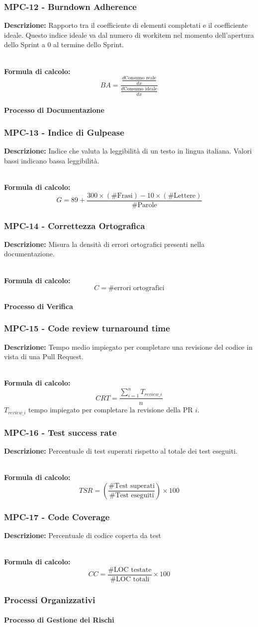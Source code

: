 \documentclass[a4paper,12pt]{article}
\newcommand{\metricdef}[3]{
    \subsubsection*{#1 - #2}
    \textbf{Descrizione:} #3
}
\newcommand{\metricformula}[1]{
    \\[0.5em]
    \textbf{Formula di calcolo:}
    \begin{equation*}
        #1
    \end{equation*}
}
\begin{document}
\metricdef{MPC-12}{Burndown Adherence}
{Rapporto tra il coefficiente di elementi completati e il coefficiente ideale. Questo indice ideale va dal numero di workitem nel momento dell'apertura dello Sprint a 0 al termine dello Sprint.}
\metricformula{BA = \frac{\frac{d \text{Consumo reale}}{dx}}{\frac{d \text{Consumo ideale}}{dx}}}

\paragraph{Processo di Documentazione}

\metricdef{MPC-13}{Indice di Gulpease}
{Indice che valuta la leggibilità di un testo in lingua italiana. Valori bassi indicano bassa leggibilità.}
\metricformula{G = 89 + \frac{300 \times (\#\text{Frasi}) - 10 \times (\#\text{Lettere})}{\#\text{Parole}}}

\metricdef{MPC-14}{Correttezza Ortografica}
{Misura la densità di errori ortografici presenti nella documentazione.}
\metricformula{C = \#\text{errori ortografici}}

\paragraph{Processo di Verifica}

\metricdef{MPC-15}{Code review turnaround time}
{Tempo medio impiegato per completare una revisione del codice in vista di una Pull Request.}
\metricformula{CRT = \frac{\sum_{i=1}^{n} T_{review\_i}}{n}} $T_{review\_i}$ tempo impiegato per completare la revisione della PR $i$.

\metricdef{MPC-16}{Test success rate}
{Percentuale di test superati rispetto al totale dei test eseguiti.}
\metricformula{TSR = \left( \frac{\#\text{Test superati}}{\#\text{Test eseguiti}} \right) \times 100}

\metricdef{MPC-17}{Code Coverage}
{Percentuale di codice coperta da test}
\metricformula{CC = \frac{\#\text{LOC testate}}{\#\text{LOC totali}} \times 100}

\subsubsection{Processi Organizzativi}

\paragraph{Processo di Gestione dei Rischi} \label{gestione_rischi_operativi}
\end{document}
